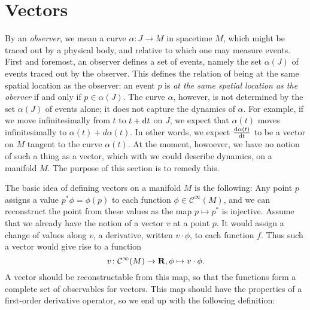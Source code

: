 \section{Vectors}
\label{sec:vectors}

By an \emph{observer}, we mean a curve $\alpha\colon J \to M$ in spacetime $M$,
which might be traced out by a physical body, and relative to which one may
measure events. First and foremost, an observer defines a set of events, namely
the set $\alpha(J)$ of events traced out by the observer. This defines the
relation of being at the same spatial location as the observer: an event $p$ is 
\emph{at the same spatial location as the oberver} if and only if
$p \in \alpha(J)$. The curve $\alpha$, however, is not determined by the set
$\alpha(J)$ of events alone; it does not capture the dynamics of $\alpha$.
For example, if we move infinitesimally from $t$ to $t + \mathrm d t$ on $J$, we
expect that $\alpha(t)$ moves infinitesimally to $\alpha(t) + d \alpha(t)$. In
other words, we expect $\frac{\mathrm d\alpha(t)}{\mathrm d t}$ to be a vector on $M$
tangent to the curve $\alpha(t)$. At the moment, howoever, we have no notion of
such a thing as a vector, which with we could describe dynamics, on a manifold $M$.
The purpose of this section is to remedy this.

The basic idea of defining vectors on a manifold $M$ is the following:
Any point $p$ assigns a value $p^* \phi = \phi(p)$ to each function
$\phi \in \mathcal C^\infty(M)$, and we can reconstruct the point from these
values as the map $p \mapsto p^*$
is injective. Assume that we already have the notion of a vector $v$ at a point $p$.
It would assign a change of values along $v$, a derivative, written $v \cdot \phi$, to each
function $f$. Thus such a vector would give rise to a function
\[
  v\colon \mathcal C^\infty(M) \to \mathbf{R}, \phi \mapsto v \cdot \phi.
\]
A vector should be reconstructable from this map, so that the functions form
a complete set of observables for vectors. This map should have the
properties of a first-order derivative operator, so we end up with the following
definition:

